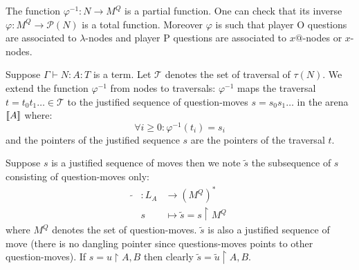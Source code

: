 The function $\varphi^{-1} : N \rightarrow M^Q$ is a partial function. One can check that its inverse
$\varphi : M^Q \rightarrow \mathcal{P}(N)$ is a total function.
Moreover $\varphi$ is such that player O questions are associated to $\lambda$-nodes
and player P questions are associated to $x @$-nodes or $x$-nodes.


Suppose $\Gamma \vdash N:A : T$ is a term.
Let $\mathcal{T}$ denotes the set of traversal of $\tau(N)$. We extend the function $\varphi^{-1}$
from nodes to traversals: $\varphi^{-1}$ maps the traversal $t = t_0 t_1 \ldots \in \mathcal{T}$ to the justified sequence
of question-moves $s = s_0 s_1 \ldots$ in the arena ${[\![ A ]\!]}$ where:
$$\forall i\geq0 : \varphi^{-1}(t_i) = s_i$$
and the pointers of the justified sequence $s$ are the pointers of the traversal $t$.

\begin{dfn}
Suppose $s$ is a justified sequence of moves then we note $\tilde{s}$
the subsequence of $s$ consisting of question-moves only:
\begin{eqnarray*}
\tilde{} &: L_A &\longrightarrow (M^Q)^* \\
& s &\longmapsto \tilde{s} = s \upharpoonright M^Q
\end{eqnarray*}
where $M^Q$ denotes the set of question-moves.
$\tilde{s}$ is also a justified sequence of move (there is no dangling pointer since questions-moves points to other question-moves).
If $s = u\upharpoonright A,B$ then clearly $\tilde{s} = \tilde{u} \upharpoonright A,B$.
\end{dfn}


